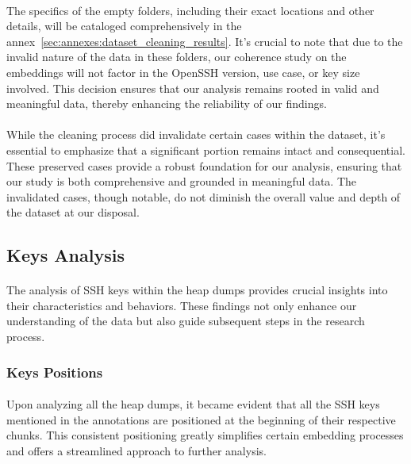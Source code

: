             \paragraph{}The specifics of the empty folders, including their exact locations and other details, will be cataloged comprehensively in the annex~\ref{sec:annexes:dataset_cleaning_results}. It's crucial to note that due to the invalid nature of the data in these folders, our coherence study on the embeddings will not factor in the OpenSSH version, use case, or key size involved. This decision ensures that our analysis remains rooted in valid and meaningful data, thereby enhancing the reliability of our findings.

            \paragraph{}While the cleaning process did invalidate certain cases within the dataset, it's essential to emphasize that a significant portion remains intact and consequential. These preserved cases provide a robust foundation for our analysis, ensuring that our study is both comprehensive and grounded in meaningful data. The invalidated cases, though notable, do not diminish the overall value and depth of the dataset at our disposal.
    
    \subsection{Keys Analysis}

        \paragraph{}The analysis of SSH keys within the heap dumps provides crucial insights into their characteristics and behaviors. These findings not only enhance our understanding of the data but also guide subsequent steps in the research process.
    
        \subsubsection{Keys Positions}
    
            \paragraph{}Upon analyzing all the heap dumps, it became evident that all the SSH keys mentioned in the annotations are positioned at the beginning of their respective chunks. This consistent positioning greatly simplifies certain embedding processes and offers a streamlined approach to further analysis.
    
